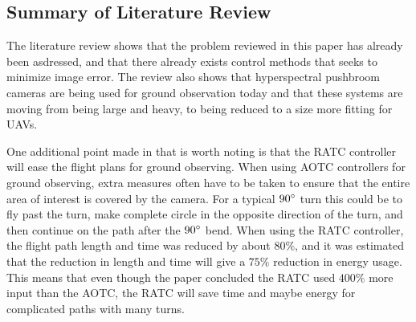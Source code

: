 \subsection{Summary of Literature Review}
The literature review shows that the problem reviewed in this paper has already been asdressed, and that there already exists control methods that seeks to minimize image error. The review also shows that hyperspectral pushbroom cameras are being used for ground observation today and that these systems are moving from being large and heavy, to being reduced to a size more fitting for UAVs.

One additional point made in \cite{ratcFISHER} that is worth noting is that the RATC controller will ease the flight plans for ground observing. When using AOTC controllers for ground observing, extra measures often have to be taken to ensure that the entire area of interest is covered by the camera. For a typical $90 \degree$ turn this could be to fly past the turn, make complete circle in the opposite direction of the turn, and then continue on the path after the $90 \degree$ bend. When using the RATC controller, the flight path length and time was reduced by about $80 \%$, and it was estimated that the reduction in length and time will give a $75\%$ reduction in energy usage. This means that even though the paper concluded the RATC used $400 \%$ more input than the AOTC, the RATC will save time and maybe energy for complicated paths with many turns.